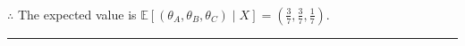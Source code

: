 \documentclass{article}
\begin{document}
\subsubsection*{\normalfont}{$\therefore$ The expected value is $\mathbb{E}[\left(\theta_{A}, \theta_{B}, \theta_{C}\right) \mid X] = \left(\frac{3}{7}, \frac{3}{7}, \frac{1}{7}\right)$.} \\

\noindent\rule{\textwidth}{0.4pt}\\

\newpage
\end{document}
